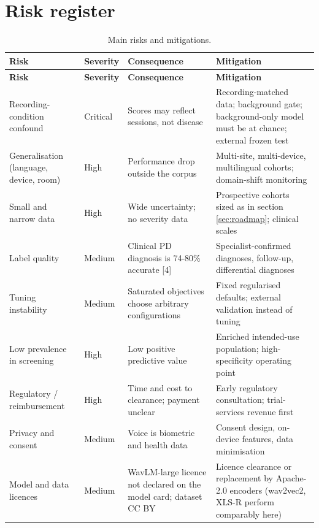 \documentclass[10pt,a4paper]{article}
\begin{document}
\section{Risk register}\label{sec:risks}
\begin{center}\scriptsize\renewcommand{\arraystretch}{1.12}
\begin{longtable}{p{3.4cm}p{1.4cm}p{4.4cm}p{6.6cm}}
\caption{Main risks and mitigations.}\\
\toprule
\textbf{Risk} & \textbf{Severity} & \textbf{Consequence} & \textbf{Mitigation}\\\midrule\endfirsthead
\toprule
\textbf{Risk} & \textbf{Severity} & \textbf{Consequence} & \textbf{Mitigation}\\\midrule\endhead
\bottomrule\endfoot
Recording-condition confound & Critical & Scores may reflect sessions, not disease & Recording-matched data; background gate; background-only model must be at chance; external frozen test\\
Generalisation (language, device, room) & High & Performance drop outside the corpus & Multi-site, multi-device, multilingual cohorts; domain-shift monitoring\\
Small and narrow data & High & Wide uncertainty; no severity data & Prospective cohorts sized as in section \ref{sec:roadmap}; clinical scales\\
Label quality & Medium & Clinical PD diagnosis is 74-80\% accurate [4] & Specialist-confirmed diagnoses, follow-up, differential diagnoses\\
Tuning instability & Medium & Saturated objectives choose arbitrary configurations & Fixed regularised defaults; external validation instead of tuning\\
Low prevalence in screening & High & Low positive predictive value & Enriched intended-use population; high-specificity operating point\\
Regulatory / reimbursement & High & Time and cost to clearance; payment unclear & Early regulatory consultation; trial-services revenue first\\
Privacy and consent & Medium & Voice is biometric and health data & Consent design, on-device features, data minimisation\\
Model and data licences & Medium & WavLM-large licence not declared on the model card; dataset CC BY & Licence clearance or replacement by Apache-2.0 encoders (wav2vec2, XLS-R perform comparably here)\\
\end{longtable}\end{center}
\end{document}
